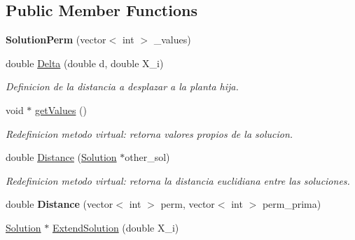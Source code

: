 \subsection*{Public Member Functions}
\begin{DoxyCompactItemize}
\item 
\hypertarget{class_solution_perm_a71ea7ad7c43c4b9ce6058640acd24bae}{{\bfseries Solution\+Perm} (vector$<$ int $>$ \+\_\+values)}\label{class_solution_perm_a71ea7ad7c43c4b9ce6058640acd24bae}

\item 
\hypertarget{class_solution_perm_a19e9bfc6873053fa4cb2644fb0ceadba}{double \hyperlink{class_solution_perm_a19e9bfc6873053fa4cb2644fb0ceadba}{Delta} (double d, double X\+\_\+i)}\label{class_solution_perm_a19e9bfc6873053fa4cb2644fb0ceadba}

\begin{DoxyCompactList}\small\item\em Definicion de la distancia a desplazar a la planta hija. \end{DoxyCompactList}\item 
\hypertarget{class_solution_perm_a087dca9092baa1bfe8d52270f3e927a5}{void $\ast$ \hyperlink{class_solution_perm_a087dca9092baa1bfe8d52270f3e927a5}{get\+Values} ()}\label{class_solution_perm_a087dca9092baa1bfe8d52270f3e927a5}

\begin{DoxyCompactList}\small\item\em Redefinicion metodo virtual\+: retorna valores propios de la solucion. \end{DoxyCompactList}\item 
\hypertarget{class_solution_perm_a8cdccc3689d67ddb773a5384bb0be7f1}{double \hyperlink{class_solution_perm_a8cdccc3689d67ddb773a5384bb0be7f1}{Distance} (\hyperlink{class_solution}{Solution} $\ast$other\+\_\+sol)}\label{class_solution_perm_a8cdccc3689d67ddb773a5384bb0be7f1}

\begin{DoxyCompactList}\small\item\em Redefinicion metodo virtual\+: retorna la distancia euclidiana entre las soluciones. \end{DoxyCompactList}\item 
\hypertarget{class_solution_perm_aef2c6326c6a9d77b0e33ed9c024dc2e1}{double {\bfseries Distance} (vector$<$ int $>$ perm, vector$<$ int $>$ perm\+\_\+prima)}\label{class_solution_perm_aef2c6326c6a9d77b0e33ed9c024dc2e1}

\item 
\hypertarget{class_solution_perm_ae2d233dbbd83af831e7fe0fde16906ff}{\hyperlink{class_solution}{Solution} $\ast$ \hyperlink{class_solution_perm_ae2d233dbbd83af831e7fe0fde16906ff}{Extend\+Solution} (double X\+\_\+i)}\label{class_solution_perm_ae2d233dbbd83af831e7fe0fde16906ff}


\end{DoxyCompactItemize}
